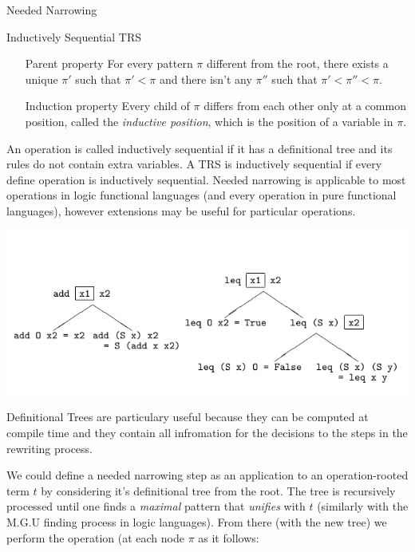 \documentclass{beamer}
\begin{document}
\begin{section}{Needed Narrowing}
\begin{subsection}{Inductively Sequential TRS}
\begin{frame}
  \begin{itemize}
    \setlength{\itemindent}{2cm}
    \item[Parent property] For every pattern $\pi$ different from the root, there exists a unique $\pi'$ such that $\pi' < \pi$ and there isn't any $\pi''$ such that $\pi' < \pi'' < \pi$.
    \item[Induction property] Every child of $\pi$ differs from each other only at a common position, called the \textit{inductive position}, which is the position of a variable in $\pi$.
    \end{itemize}
    An operation is called inductively sequential if it has a definitional tree and its rules do not contain extra variables. A TRS is inductively sequential if every define operation is inductively sequential. Needed narrowing is applicable to most operations in logic functional languages (and every operation in pure functional languages), however extensions may be useful for particular operations.
\end{frame}

\begin{frame}

\includegraphics[scale=0.5]{pictures/def_trees.png}
  
\end{frame}

\begin{frame}

  Definitional Trees are particulary useful because they can be computed at compile time and they contain all infromation for the decisions to the steps in the rewriting process.

  We could define a needed narrowing step as an application to an operation-rooted term $t$ by considering it's definitional tree from the root. The tree is recursively processed until one finds a \textit{maximal} pattern that \textit{unifies} with $t$ (similarly with the M.G.U finding process in logic languages). From there (with the new tree) we perform the operation (at each node $\pi$ as it follows:


\end{frame}
\end{subsection}
\end{section}
\end{document}
